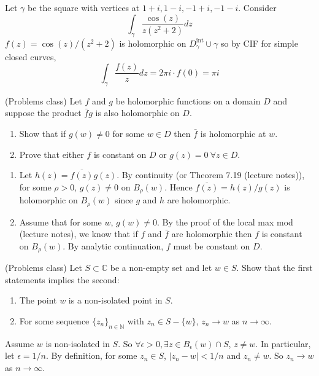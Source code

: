\begin{example}
	Let $\gamma$ be the square with vertices at $1 + i, 1 - i, -1 + i, -1 - i$. Consider
	\[
		\int_{\gamma} \frac{\cos(z)}{z (z^2 + 2)} dz
	\]
	$f(z) = \cos(z) / (z^2 + 2)$ is holomorphic on $D_{\gamma}^{\text{int}} \cup \gamma$ so by CIF for simple closed curves,
	\[
		\int_{\gamma} \frac{f(z)}{z} dz = 2 \pi i \cdot f(0) = \pi i
	\]
\end{example}

\begin{example}
	(Problems class) Let $f$ and $g$ be holomorphic functions on a domain $D$ and suppose the product $\bar{f} g$ is also holomorphic on $D$.
	\begin{enumerate}
		\item Show that if $g(w) \ne 0$ for some $w \in D$ then $\bar{f}$ is holomorphic at $w$.
		\item Prove that either $f$ is constant on $D$ or $g(z) = 0 \ \forall z \in D$.
	\end{enumerate}

	\begin{enumerate}
		\item Let $h(z) = \overline{f(z)} g(z)$. By continuity (or Theorem 7.19 (lecture notes)), for some $\rho > 0$, $g(z) \ne 0$ on $B_{\rho}(w)$. Hence $\overline{f(z)} = h(z) / g(z)$ is holomorphic on $B_{\rho}(w)$ since $g$ and $h$ are holomorphic.
		\item Assume that for some $w$, $g(w) \ne 0$. By the proof of the local max mod (lecture notes), we know that if $f$ and $\bar{f}$ are holomorphic then $f$ is constant on $B_{\rho}(w)$. By analytic continuation, $f$ must be constant on $D$.
	\end{enumerate}
\end{example}

\begin{example}
	(Problems class) Let $S \subset \mathbb{C}$ be a non-empty set and let $w \in S$. Show that the first statements implies the second:
	\begin{enumerate}
		\item The point $w$ is a non-isolated point in $S$.
		\item For some sequence $\{ z_n \}_{n \in \mathbb{N}}$ with $z_n \in S - \{ w \}$, $z_n \rightarrow w$ as $n \rightarrow \infty$.
	\end{enumerate}

	Assume $w$ is non-isolated in $S$. So $\forall \epsilon > 0, \exists z \in B_{\epsilon}(w) \cap S$, $z \ne w$. In particular, let $\epsilon = 1 / n$. By definition, for some $z_n \in S$, $|z_n - w| < 1 / n$ and $z_n \ne w$. So $z_n \rightarrow w$ as $n \rightarrow \infty$.
\end{example}

